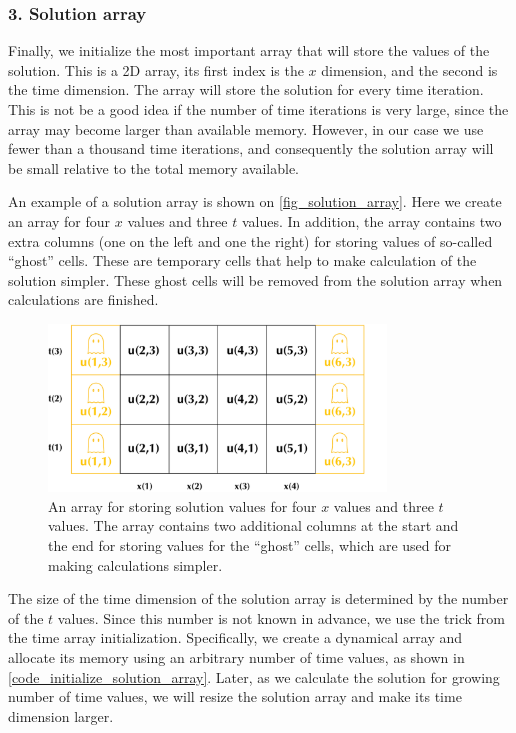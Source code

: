 \subsubsection*{3. Solution array}

Finally, we initialize the most important array that will store the values of the solution. This is a 2D array, its first index is the $x$ dimension, and the second is the time dimension. The array will store the solution for every time iteration. This is not be a good idea if the number of time iterations is very large, since the array may become larger than available memory. However, in our case we use fewer than a thousand time iterations, and consequently the solution array will be small relative to the total memory available.

An example of a solution array is shown on \autoref{fig_solution_array}. Here we create an array for four $x$ values and three $t$ values. In addition, the array contains two extra columns (one on the left and one the right) for storing values of so-called ``ghost'' cells. These are temporary cells that help to make calculation of the solution simpler. These ghost cells will be removed from the solution array when calculations are finished.

\begin{figure}[!ht]
    \centering
    \includegraphics[width=0.8\textwidth]{figures/solution_array.pdf}
    \caption{An array for storing solution values for four $x$ values and three $t$ values. The array contains two additional columns at the start and the end for storing values for the ``ghost'' cells, which are used for making calculations simpler. }
    \label{fig_solution_array}
\end{figure}

The size of the time dimension of the solution array is determined by the number of the $t$ values. Since this number is not known in advance, we use the trick from the time array initialization. Specifically, we create a dynamical  array and allocate its memory using an arbitrary number of time values, as shown in \autoref{code_initialize_solution_array}. Later, as we calculate the solution for growing number of time values, we will resize the solution array and make its time dimension larger.


